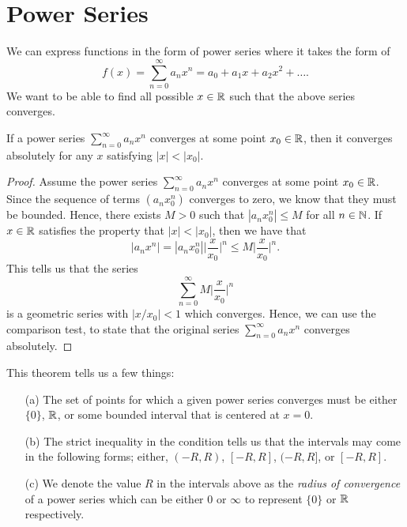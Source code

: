 
\section{Power Series}

We can express functions in the form of power series where it takes the form of 
\[  f(x) = \sum_{ n=0  }^{  \infty  } a_n x^n = a_0 + a_1 x + a_2 x^2 + \dots . \]
We want to be able to find all possible \( x \in \mathbb{R} \) such that the above series converges. 

\begin{theorem}
If a power series \( \sum_{ n=0  }^{ \infty  } a_n x^n  \) converges at some point \( x_0 \in \mathbb{R}  \), then it converges absolutely for any \( x  \) satisfying \( | x  |  < | x_0  |  \).
\end{theorem}

\begin{proof}
Assume the power series \( \sum_{ n=0  }^{ \infty  } a_n x^n  \) converges at some point \( x_0 \in \mathbb{R}  \). Since the sequence of terms \( (a_n x_0^n) \) converges to zero, we know that they must be bounded. Hence, there exists \( M > 0  \) such that \( | a_n x_0^n |  \leq M  \) for all \( n \in \mathbb{N}  \). If \( x \in \mathbb{R}  \) satisfies the property that \( | x  |  < | x_0  |  \), then we have that 
\[  | a_n x^n  |  = | a_n x_0^n  | \Big| \frac{ x  }{  x_0  }  \Big|^n \leq M \Big| \frac{ x  }{  x_0  }  \Big|^n.\] This tells us that the series 
\[  \sum_{ n=0  }^{  \infty   } M \Big| \frac{ x  }{  x_0  }  \Big|^n  \] is a geometric series with \( | x / x_0  |  <  1  \) which converges. Hence, we can use the comparison test, to state that the original series \( \sum_{ n = 0  }^{  \infty  } a_n x^n  \) converges absolutely.
\end{proof}

This theorem tells us a few things:
\begin{enumerate}
    \item[(a)] The set of points for which a given power series converges must be either \( \{ 0  \}  \), \( \mathbb{R}  \), or some bounded interval that is centered at \( x = 0  \). 
    \item[(b)] The strict inequality in the condition tells us that the intervals may come in the following forms; either, \( (-R , R ) \), \( [-R, R ] \), \( (-R, R ] \), or \( [-R , R ] \).
    \item[(c)] We denote the value \( R  \) in the intervals above as the \textit{radius of convergence} of a power series which can be either \( 0  \) or \( \infty  \) to represent \( \{ 0  \}  \) or \( \mathbb{R}   \) respectively.
\end{enumerate} 

